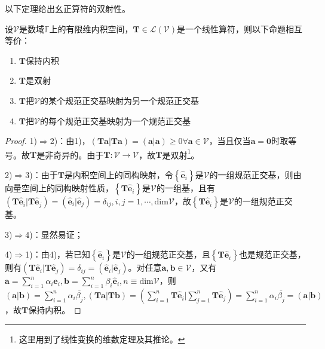 \documentclass[main.tex]{subfiles}
\begin{document}
以下定理给出幺正算符的双射性。

\begin{theorem}\label{thm:II.6.3}
    设$\mathcal{V}$是数域$\mathbb{F}$上的有限维内积空间，$\mathbf{T}\in\mathcal{L}\left(\mathcal{V}\right)$是一个线性算符，则以下命题相互等价：
    \begin{enumerate}
        \item $\mathbf{T}$保持内积
        \item $\mathbf{T}$是双射
        \item $\mathbf{T}$把$\mathcal{V}$的某个规范正交基映射为另一个规范正交基
        \item $\mathbf{T}$把$\mathcal{V}$的每个规范正交基映射为一个规范正交基
    \end{enumerate}
\end{theorem}
\begin{proof}
    1)$\Rightarrow$2)：由1)，$\left(\mathbf{Ta}|\mathbf{Ta}\right)=\left(\mathbf{a}|\mathbf{a}\right)\geq0\forall\mathbf{a}\in\mathcal{V}$，当且仅当$\mathbf{a}=\mathbf{0}$时取等号。故$\mathbf{T}$是非奇异的。由于$\mathbf{T}:\mathcal{V}\rightarrow\mathcal{V}$，故$\mathbf{T}$是双射\footnote{这里用到了线性变换的维数定理及其推论。}。

    2)$\Rightarrow$3)：由于$\mathbf{T}$是内积空间上的同构映射，令$\left\{\mathbf{\hat{e}}_i\right\}$是$\mathcal{V}$的一组规范正交基，则由向量空间上的同构映射性质，$\left\{\mathbf{T\hat{e}}_i\right\}$是$\mathcal{V}$的一组基，且有$\left(\mathbf{T\hat{e}}_i|\mathbf{T\hat{e}}_j\right)=\left(\mathbf{\hat{e}}_i|\mathbf{\hat{e}}_j\right)=\delta_{ij},i,j=1,\cdots,\mathrm{dim}\mathcal{V}$，故$\left\{\mathbf{T\hat{e}}_i\right\}$是$\mathcal{V}$的一组规范正交基。

    3)$\Rightarrow$4)：显然易证；

    4)$\Rightarrow$1)：由4)，若已知$\left\{\mathbf{\hat{e}}_i\right\}$是$\mathcal{V}$的一组规范正交基，且$\left\{\mathbf{T\hat{e}}_i\right\}$也是规范正交基，则有$\left(\mathbf{T\hat{e}}_i|\mathbf{T\hat{e}}_j\right)=\delta_{ij}=\left(\mathbf{\hat{e}}_i|\mathbf{\hat{e}}_j\right)$。对任意$\mathbf{a},\mathbf{b}\in\mathcal{V}$，又有$\mathbf{a}=\sum_{i=1}^{n}\alpha_i\mathbf{\hat{e}}_i,\mathbf{b}=\sum_{i=1}^{n}\beta_i\mathbf{\hat{e}}_i,n\equiv\mathrm{dim}\mathcal{V}$，则$\left(\mathbf{a}|\mathbf{b}\right)=\sum_{i=1}^n\alpha_i\overline{\beta_j},\left(\mathbf{Ta}|\mathbf{Tb}\right)=\left(\sum_{i=1}^n\mathbf{T\hat{e}}_i|\sum_{j=1}^n\mathbf{T\hat{e}}_j\right)=\sum_{i=1}^n\alpha_i\overline{\beta_j}=\left(\mathbf{a}|\mathbf{b}\right)$，故$\mathbf{T}$保持内积。
\end{proof}
\end{document}

